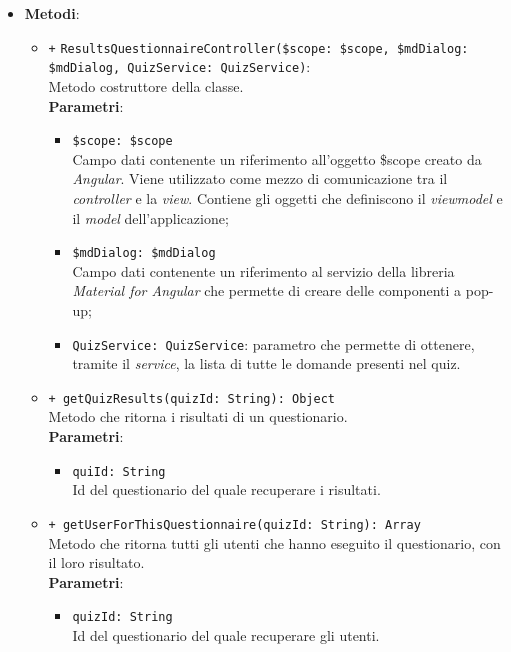 \begin{itemize}
\begin{itemize}
	\end{itemize}
	\item \textbf{Metodi}:
	\begin{itemize}
		\item \texttt{+} \texttt{ResultsQuestionnaireController(\$scope: \$scope, \$mdDialog: \$mdDialog, QuizService: QuizService)}: \\Metodo costruttore della classe. \\
		\textbf{Parametri}:
			\begin{itemize}
					\item \texttt{\$scope: \$scope} \\
					Campo dati contenente un riferimento all'oggetto \$scope creato da \textit{Angular}. Viene utilizzato come mezzo di comunicazione tra il \textit{controller\ped{G}} e la \textit{view}. Contiene gli oggetti che definiscono il \textit{viewmodel\ped{G}} e il \textit{model} dell'applicazione;
					\item \texttt{\$mdDialog: \$mdDialog} \\
					Campo dati contenente un riferimento al servizio della libreria \textit{Material for Angular} che permette di creare delle componenti a pop-up;
					\item \texttt{QuizService: QuizService}: parametro che permette di ottenere, tramite il \textit{service}, la lista di tutte le domande presenti nel quiz. 
			\end{itemize}
		\item \texttt{+ getQuizResults(quizId: String): Object} \\ Metodo che ritorna i risultati di un questionario. \\
		\textbf{Parametri}:
		\begin{itemize}
			\item \texttt{quiId: String} \\ Id del questionario del quale recuperare i risultati.
		\end{itemize}
		\item \texttt{+ getUserForThisQuestionnaire(quizId: String): Array} \\ Metodo che ritorna tutti gli utenti che hanno eseguito il questionario, con il loro risultato. \\
		\textbf{Parametri}:
		\begin{itemize}
			\item \texttt{quizId: String} \\ Id del questionario del quale recuperare gli utenti.
		\end{itemize}
	\end{itemize}
\end{itemize}

